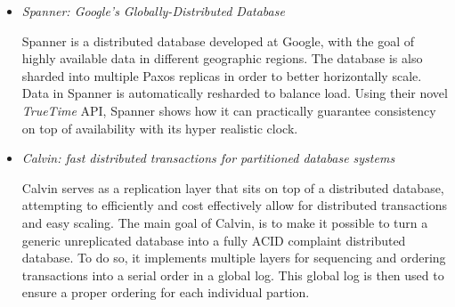 \documentclass{article}
\begin{document}
\begin{itemize}

	\item
	\textit{Spanner: Google's Globally-Distributed Database} \cite{Spanner}

	Spanner is a distributed database developed at Google, with the goal of highly available data in different geographic regions.
	The database is also sharded into multiple Paxos replicas in order to better horizontally scale. Data in Spanner is automatically resharded to balance load.
	Using their novel \textit{TrueTime} API, Spanner shows how it can practically guarantee consistency on top of availability with its hyper realistic clock.

	\item
	\textit{Calvin: fast distributed transactions for partitioned database systems} \cite{Calvin}

	Calvin serves as a replication layer that sits on top of a distributed database, attempting to efficiently and cost effectively allow for distributed transactions and easy scaling. The main goal of Calvin, is to make it possible to turn a generic unreplicated database into a fully ACID complaint distributed database.
	To do so, it implements multiple layers for sequencing and ordering transactions into a serial order in a global log. This global log is then used to ensure a proper ordering for each individual partion.

\end{itemize}



\end{document}

